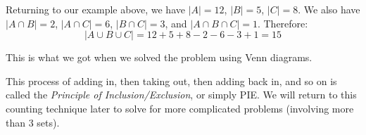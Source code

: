 \documentclass[12pt,]{book}
\theoremstyle{plain}
\theoremstyle{definition}
\theoremstyle{definition}
\theoremstyle{definition}
\numberwithin{equation}{chapter}
\newcommand{\card}[1]{\left| #1 \right|}
\begin{document}
\par
\hypertarget{p-772}{}%
Returning to our example above, we have \(\card{A} = 12\), \(\card{B} = 5\), \(\card{C} = 8\). We also have \(\card{A \cap B} = 2\), \(\card{A \cap C} = 6\), \(\card{B \cap C} = 3\), and \(\card{A \cap B \cap C} = 1\). Therefore:%
\begin{equation*}
\card{A \cup B \cup C} = 12 + 5 + 8 - 2 - 6 - 3 + 1 = 15
\end{equation*}
%
\par
\hypertarget{p-773}{}%
This is what we got when we solved the problem using Venn diagrams.%
\par
\hypertarget{p-774}{}%
This process of adding in, then taking out, then adding back in, and so on is called the \emph{Principle of Inclusion/Exclusion}, or simply PIE. We will return to this counting technique later to solve for more complicated problems (involving more than 3 sets).%
\typeout{************************************************}
\typeout{************************************************}
\end{document}
